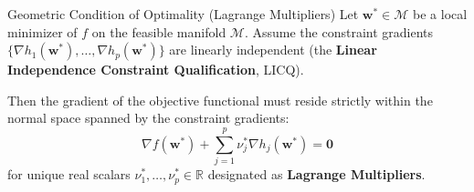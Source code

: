 \begin{theorembox}{Geometric Condition of Optimality (Lagrange Multipliers)}
Let $\mathbf{w}^* \in \mathcal{M}$ be a local minimizer of $f$ on the feasible manifold $\mathcal{M}$. Assume the constraint gradients $\{\nabla h_1(\mathbf{w}^*), \dots, \nabla h_p(\mathbf{w}^*)\}$ are linearly independent (the \textbf{Linear Independence Constraint Qualification}, LICQ).

Then the gradient of the objective functional must reside strictly within the normal space spanned by the constraint gradients:
\begin{equation}
\nabla f(\mathbf{w}^*) + \sum_{j=1}^p \nu_j^* \nabla h_j(\mathbf{w}^*) = \mathbf{0}
\label{eq:lagrange_stationarity}
\end{equation}
for unique real scalars $\nu_1^*, \dots, \nu_p^* \in \mathbb{R}$ designated as \textbf{Lagrange Multipliers}.
\end{theorembox}

